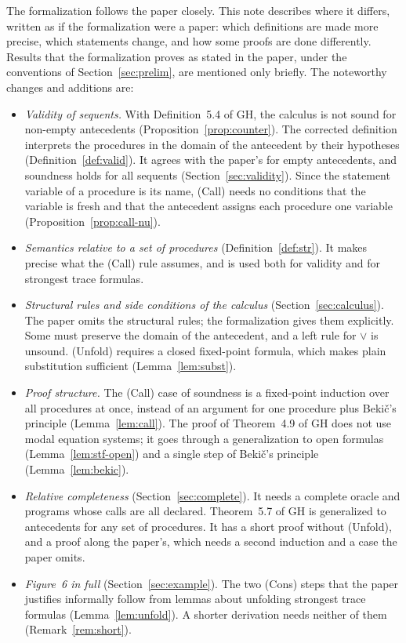 \documentclass[11pt]{article}
\newcommand{\GH}[1]{#1 of GH}
\theoremstyle{plain}
\theoremstyle{definition}
\theoremstyle{remark}
\begin{document}
The formalization follows the paper closely. This note describes where it
differs, written as if the formalization were a paper: which definitions are
made more precise, which statements change, and how some proofs are done
differently. Results that the formalization proves as stated in the paper,
under the conventions of Section~\ref{sec:prelim}, are mentioned only
briefly. The noteworthy changes and additions are:
\begin{itemize}
\item \emph{Validity of sequents.} With \GH{Definition~5.4}, the calculus
  is not sound for non-empty antecedents
  (Proposition~\ref{prop:counter}). The corrected definition interprets the
  procedures in the domain of the antecedent by their hypotheses
  (Definition~\ref{def:valid}). It agrees with the paper's for empty
  antecedents, and soundness holds for all sequents
  (Section~\ref{sec:validity}). Since the statement variable of a
  procedure is its name, (Call) needs no conditions that the variable is
  fresh and that the antecedent assigns each procedure one variable
  (Proposition~\ref{prop:call-nu}).
\item \emph{Semantics relative to a set of procedures}
  (Definition~\ref{def:str}). It makes precise what the (Call) rule assumes,
  and is used both for validity and for strongest trace formulas.
\item \emph{Structural rules and side conditions of the calculus}
  (Section~\ref{sec:calculus}). The paper omits the structural rules; the
  formalization gives them explicitly. Some must preserve the domain of the
  antecedent, and a left rule for $\lor$ is unsound. (Unfold) requires a
  closed fixed-point formula, which makes plain substitution sufficient
  (Lemma~\ref{lem:subst}).
\item \emph{Proof structure.} The (Call) case of soundness is a
  fixed-point induction over all procedures at once, instead of an argument
  for one procedure plus Beki\v{c}'s principle (Lemma~\ref{lem:call}). The
  proof of \GH{Theorem~4.9} does not use modal equation systems; it goes
  through a generalization to open formulas (Lemma~\ref{lem:stf-open}) and
  a single step of Beki\v{c}'s principle (Lemma~\ref{lem:bekic}).
\item \emph{Relative completeness} (Section~\ref{sec:complete}). It needs
  a complete oracle and programs whose calls are all declared.
  \GH{Theorem~5.7} is generalized to antecedents for any set of procedures.
  It has a short proof without (Unfold), and a proof along the paper's,
  which needs a second induction and a case the paper omits.
\item \emph{Figure~6 in full} (Section~\ref{sec:example}). The two (Cons)
  steps that the paper justifies informally follow from lemmas about
  unfolding strongest trace formulas (Lemma~\ref{lem:unfold}). A shorter
  derivation needs neither of them (Remark~\ref{rem:short}).
\end{itemize}
\end{document}
